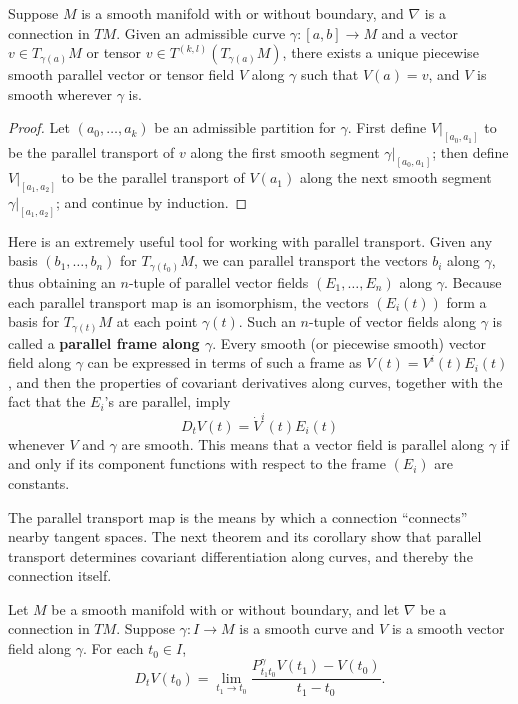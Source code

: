 \begin{corollary}
\label{cor:parallel-transport-piecewise-smooth-curves}
Suppose $M$ is a smooth manifold with or without boundary, and $\nabla$ is a connection in $TM$. Given an admissible curve $\gamma : [a,b] \to M$ and a vector $v \in T_{\gamma(a)}M$ or tensor $v \in T^{(k,l)}(T_{\gamma(a)} M)$, there exists a unique piecewise smooth parallel vector or tensor field $V$ along $\gamma$ such that $V(a) = v$, and $V$ is smooth wherever $\gamma$ is.
\end{corollary}

\begin{proof}
Let $(a_0,\ldots,a_k)$ be an admissible partition for $\gamma$. First define $V|_{[a_0,a_1]}$ to be the parallel transport of $v$ along the first smooth segment $\gamma|_{[a_0,a_1]}$; then define $V|_{[a_1,a_2]}$ to be the parallel transport of $V(a_1)$ along the next smooth segment $\gamma|_{[a_1,a_2]}$; and continue by induction.
\end{proof}

Here is an extremely useful tool for working with parallel transport. Given any basis $(b_1,\ldots,b_n)$ for $T_{\gamma(t_0)}M$, we can parallel transport the vectors $b_i$ along $\gamma$, thus obtaining an $n$-tuple of parallel vector fields $(E_1,\ldots,E_n)$ along $\gamma$. Because each parallel transport map is an isomorphism, the vectors $(E_i(t))$ form a basis for $T_{\gamma(t)}M$ at each point $\gamma(t)$. Such an $n$-tuple of vector fields along $\gamma$ is called a \textbf{parallel frame along $\gamma$}. Every smooth (or piecewise smooth) vector field along $\gamma$ can be expressed in terms of such a frame as $V(t) = V^i(t) E_i(t)$, and then the properties of covariant derivatives along curves, together with the fact that the $E_i$'s are parallel, imply
\begin{equation}
D_t V(t) = \dot{V}^i(t) E_i(t) \tag{4.23}
\end{equation}
whenever $V$ and $\gamma$ are smooth. This means that a vector field is parallel along $\gamma$ if and only if its component functions with respect to the frame $(E_i)$ are constants.

The parallel transport map is the means by which a connection ``connects'' nearby tangent spaces. The next theorem and its corollary show that parallel transport determines covariant differentiation along curves, and thereby the connection itself.

\begin{theorem}
\label{thm:parallel-transport-determines-covariant-diff}
Let $M$ be a smooth manifold with or without boundary, and let $\nabla$ be a connection in $TM$. Suppose $\gamma : I \to M$ is a smooth curve and $V$ is a smooth vector field along $\gamma$. For each $t_0 \in I$,
\begin{equation}
D_t V(t_0) = \lim_{t_1 \to t_0} \frac{P_{t_1 t_0}^{\gamma} V(t_1) - V(t_0)}{t_1 - t_0}. \tag{4.24}
\end{equation}
\end{theorem}

